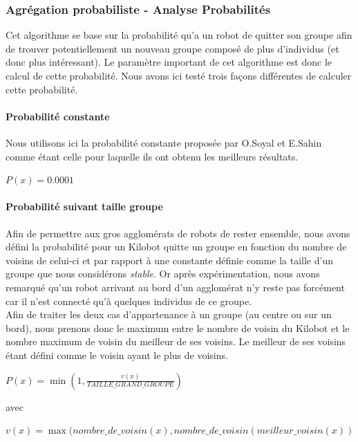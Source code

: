 \documentclass[a4paper]{article}
\begin{document}
\subsubsection{Agrégation probabiliste - Analyse Probabilités}
Cet algorithme se base sur la probabilité qu'a un robot de quitter son groupe afin de trouver potentiellement un nouveau groupe composé de plus d'individus (et donc plus intéressant). Le paramètre important de cet algorithme est donc le calcul de cette probabilité. Nous avons ici testé trois façons différentes de calculer cette probabilité.
\paragraph{Probabilité constante} Nous utilisons ici la probabilité constante proposée par O.Soyal et E.Sahin comme étant celle pour laquelle ils ont obtenu les meilleurs résultats.
\begin{center}
	$P(x)=0.0001$
\end{center}
\paragraph{Probabilité suivant taille groupe} Afin de permettre aux gros agglomérats de robots de rester ensemble, nous avons défini la probabilité pour un Kilobot quitte un groupe en fonction du nombre de voisins de celui-ci et par rapport à une constante définie comme la taille d'un groupe que nous considérons \textit{stable}. Or après expérimentation, nous avons remarqué qu'un robot arrivant au bord d'un agglomérat n'y reste pas forcément car il n'est connecté qu'à quelques individus de ce groupe.\\Afin de traiter les deux cas d'appartenance à un groupe (au centre ou sur un bord), nous prenons donc le maximum entre le nombre de voisin du Kilobot et le nombre maximum de voisin du meilleur de ses voisins. Le meilleur de ses voisins étant défini comme le voisin ayant le plus de voisins.
\begin{center}
	$P(x)=\min(1,\frac{v(x)}{TAILLE\_GRAND\_GROUPE})$
\end{center}
avec
\begin{center}
	$v(x)=\max(nombre\_de\_voisin(x),nombre\_de\_voisin(meilleur\_voisin(x))$
\end{center}
\end{document}
